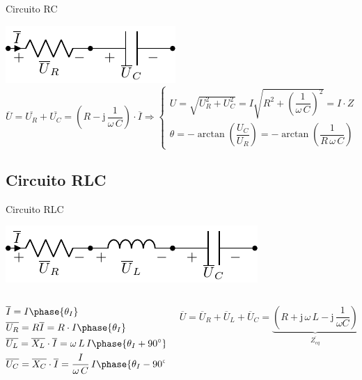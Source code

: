 \documentclass[aspectratio=169, xcolor={usenames,svgnames,dvipsnames}]{beamer}
\begin{document}
\begin{frame}{Circuito RC}
\begin{center}
\includegraphics[height=0.15\textheight]{../figs/RC.pdf}
\begin{equation*}
		\overline{U} = \overline{U_R} + \overline{U_C} =\left(R - \mathrm{j}\,\dfrac{1}{\omega\,C}\right) \cdot \overline{I}\Rightarrow 
		\begin{cases}
			U=\sqrt{U_R^2+U_C^2}=I\sqrt{R^2+\left(\dfrac{1}{\omega\,C}\right)^2}=I\cdot Z\\
			\theta=-\arctan\left( \dfrac{U_C}{U_R}\right)=-\arctan\left( \dfrac{1}{R\,\omega\,C}\right)
		\end{cases}
	\end{equation*}
\end{center}
\end{frame}

\subsection{Circuito RLC}

\begin{frame}{Circuito RLC}
\begin{center}
\includegraphics[height=0.2\textheight]{../figs/RLC.pdf}
\end{center}

\begin{columns}
\begin{column}{0.45\columnwidth}
\begin{align*}
&\overline{I}=I\phase{\theta_I}\\
    &\overline{U_R} = R \overline{I}=R\cdot I\phase{\theta_I}\\ 
    &\overline{U_L}=\overline{X_L}\cdot\overline{I}= \omega\,L\,I\phase{\theta_I+90^\circ}\\
	&\overline{U_C}=\overline{X_C}\cdot\overline{I}= \dfrac{I}{\omega\,C}\,I\phase{\theta_I-90^\circ}
\end{align*}
\end{column}

\begin{column}{0.55\columnwidth}
\begin{equation*}
  \overline{U} = \overline{U}_R + \overline{U}_L + \overline{U}_C =\underbrace{\left(R + \mathrm{j}\,\omega\,L - \mathrm{j}\,\dfrac{1}{\omega C}\right)}_{\overline{Z_{eq}}}\; \overline{I}
\end{equation*}
\end{column}
\end{columns}
\end{frame}
\end{document}
